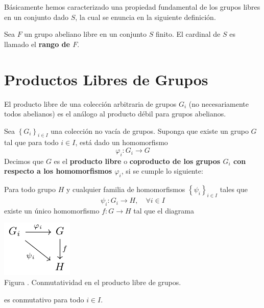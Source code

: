 \documentclass[12pt]{report}
\theoremstyle{largebreak}
\newcommand\cf[3]{\ensuremath{#1:#2\rightarrow#3}}
\newcounter{figcount}
\begin{document}
    Básicamente hemos caracterizado una propiedad fundamental de los grupos libres en un conjunto dado $S$, la cual se enuncia en la siguiente definición.

    \begin{mydef}
        Sea $F$ un grupo abeliano libre en un conjunto $S$ finito. El cardinal de $S$ es llamado el \textbf{rango de $F$}.
    \end{mydef}

    \section{Productos Libres de Grupos}

    El producto libre de una colección arbitraria de grupos $G_i$ (no necesariamente todos abelianos) es el análogo al producto débil para grupos abelianos.

    \begin{mydef}
        Sea $\left\{G_i \right\}_{ i\in I}$ una colección no vacía de grupos. Suponga que existe un grupo $G$ tal que para todo $i\in I$, está dado un homomorfismo
        \begin{equation*}
            \cf{\varphi_i}{G_i}{G}
        \end{equation*}
        Decimos que $G$ es el \textbf{producto libre} o \textbf{coproducto de los grupos $G_i$ con respecto a los homomorfismos $\varphi_i$}, si se cumple lo siguiente:
        
        Para todo grupo $H$ y cualquier familia de homomorfismos $\left\{\psi_i \right\}_{ i\in I}$ tales que
        \begin{equation*}
            \cf{\psi_i}{G_i}{H},\quad\forall i\in I
        \end{equation*}
        existe un único homomorfismo $\cf{f}{G}{H}$ tal que el diagrama

        \begin{minipage}{\textwidth}
            \begin{center}
                \includegraphics[scale=1.5]{images/fig_10.pdf}\\
                Figura \thefigcount. Conmutatividad en el producto libre de grupos.
            \end{center}
        \end{minipage}

        es conmutativo para todo $i\in I$.
    \end{mydef}
\end{document}

